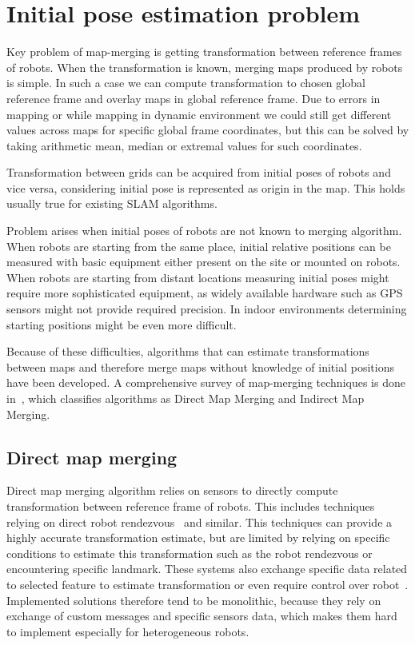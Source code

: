 \chapter{Initial pose estimation problem}
\label{chap:map-merging-intro}

Key problem of map-merging is getting transformation between reference frames of robots. When the transformation is known, merging maps produced by robots is simple. In such a case we can compute transformation to chosen global reference frame and overlay maps in global reference frame. Due to errors in mapping or while mapping in dynamic environment we could still get different values across maps for specific global frame coordinates, but this can be solved by taking arithmetic mean, median or extremal values for such coordinates.

Transformation between grids can be acquired from initial poses of robots and vice versa, considering initial pose is represented as origin in the map. This holds usually true for existing \gls{SLAM} algorithms.

Problem arises when initial poses of robots are not known to merging algorithm. When robots are starting from the same place, initial relative positions can be measured with basic equipment either present on the site or mounted on robots. When robots are starting from distant locations measuring initial poses might require more sophisticated equipment, as widely available hardware such as \gls{GPS} sensors might not provide required precision. In indoor environments determining starting positions might be even more difficult.

Because of these difficulties, algorithms that can estimate transformations between maps and therefore merge maps without knowledge of initial positions have been developed. A comprehensive survey of map-merging techniques is done in~\cite{Lee2012}, which classifies algorithms as Direct Map Merging and Indirect Map Merging.

\section{Direct map merging}

Direct map merging algorithm relies on sensors to directly compute transformation between reference frame of robots. This includes techniques relying on direct robot rendezvous~\cite{Zhou2006} and similar. This techniques can provide a highly accurate transformation estimate, but are limited by relying on specific conditions to estimate this transformation such as the robot rendezvous or encountering specific landmark. These systems also exchange specific data related to selected feature to estimate transformation or even require control over robot~\cite{Konolige2003}. Implemented solutions therefore tend to be monolithic, because they rely on exchange of custom messages and specific sensors data, which makes them hard to implement especially for heterogeneous robots.

